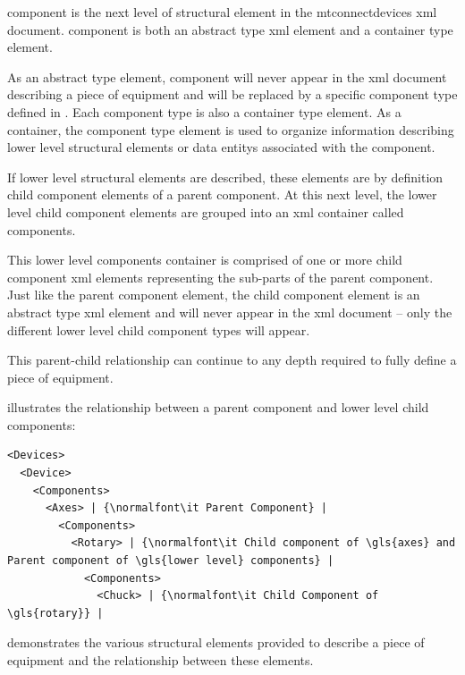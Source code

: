 \gls{component} is the next level of \gls{structural element} in the \gls{mtconnectdevices} \gls{xml} document. \gls{component} is both an abstract type \gls{xml} element and a container type element. 

As an abstract type element, \gls{component} will never appear in the \gls{xml} document describing a piece of equipment and will be replaced by a specific \gls{component} type defined in . Each \gls{component} type is also a container type element. As a container, the \gls{component} type element is used to organize information describing \gls{lower level} \glspl{structural element} or \glspl{data entity} associated with the \gls{component}.

If \gls{lower level} \glspl{structural element} are described, these elements are by definition child \gls{component} elements of a parent \gls{component}. At this next level, the \gls{lower level} child \gls{component} elements are grouped into an \gls{xml} container called \gls{components}.
 
This \gls{lower level} \gls{components} container is comprised of one or more child \gls{component} \gls{xml} elements representing the sub-parts of the parent \gls{component}. Just like the parent \gls{component} element, the child \gls{component} element is an abstract type \gls{xml} element and will never appear in the \gls{xml} document – only the different \gls{lower level} child \gls{component} types will appear.

This parent-child relationship can continue to any depth required to fully define a piece of equipment.

 illustrates the relationship between a parent \gls{component} and \gls{lower level} child components:

\begin{lstlisting}[firstnumber=1,escapechar=|,%
    caption={Component Levels},label={lst:component-levels}]
<Devices>
  <Device>
    <Components>
      <Axes> | {\normalfont\it Parent Component} |
        <Components>
          <Rotary> | {\normalfont\it Child component of \gls{axes} and Parent component of \gls{lower level} components} |
            <Components>
              <Chuck> | {\normalfont\it Child Component of \gls{rotary}} |
\end{lstlisting}

 demonstrates the various \glspl{structural element} provided to describe a piece of equipment and the relationship between these elements.


